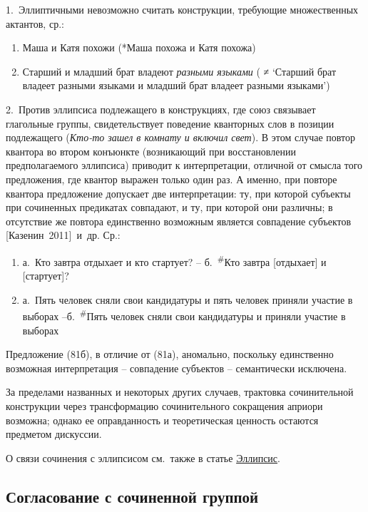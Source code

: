 1.~Эллиптичными невозможно считать конструкции, требующие множественных
актантов, ср.:

\begin{enumerate}
\def\labelenumi{(\arabic{enumi})}
\setcounter{enumi}{78}
\item
  Маша и Катя похожи (*Маша похожа и Катя похожа)
\item
  Старший и младший брат владеют \emph{разными языками} ( ≠ `Старший
  брат владеет разными языками и младший брат владеет разными языками')
\end{enumerate}

2.~Против эллипсиса подлежащего в конструкциях, где союз связывает
глагольные группы, свидетельствует поведение кванторных слов в позиции
подлежащего (\emph{Кто-то зашел в комнату и включил свет}). В этом
случае повтор квантора во втором конъюнкте (возникающий при
восстановлении предполагаемого эллипсиса) приводит к интерпретации,
отличной от смысла того предложения, где квантор выражен только один
раз. А именно, при повторе квантора предложение допускает две
интерпретации: ту, при которой субъекты при сочиненных предикатах
совпадают, и ту, при которой они различны; в отсутствие же повтора
единственно возможным является совпадение субъектов
{[}Казенин~2011{]}~и~др. Ср.:

\begin{enumerate}
\def\labelenumi{(\arabic{enumi})}
\setcounter{enumi}{80}
\item
  а.~Кто завтра отдыхает и кто стартует? -- б.~\textsuperscript{\#}Кто
  завтра {[}отдыхает{]} и {[}стартует{]}?
\item
  а.~Пять человек сняли свои кандидатуры и пять человек приняли участие
  в выборах --б.~\textsuperscript{\#}Пять человек сняли свои кандидатуры
  и приняли участие в выборах
\end{enumerate}

Предложение (81б), в отличие от (81а), аномально, поскольку единственно
возможная интерпретация -- совпадение субъектов -- семантически
исключена.

За пределами названных и некоторых других случаев, трактовка
сочинительной конструкции через трансформацию сочинительного сокращения
априори возможна; однако ее оправданность и теоретическая ценность
остаются предметом дискуссии.

О связи сочинения с эллипсисом см.~также в статье \underline{Эллипсис}.

\hypertarget{ux441ux43eux433ux43bux430ux441ux43eux432ux430ux43dux438ux435-ux441-ux441ux43eux447ux438ux43dux435ux43dux43dux43eux439-ux433ux440ux443ux43fux43fux43eux439}{%
\subsection{Согласование с сочиненной
группой}\label{ux441ux43eux433ux43bux430ux441ux43eux432ux430ux43dux438ux435-ux441-ux441ux43eux447ux438ux43dux435ux43dux43dux43eux439-ux433ux440ux443ux43fux43fux43eux439}}

